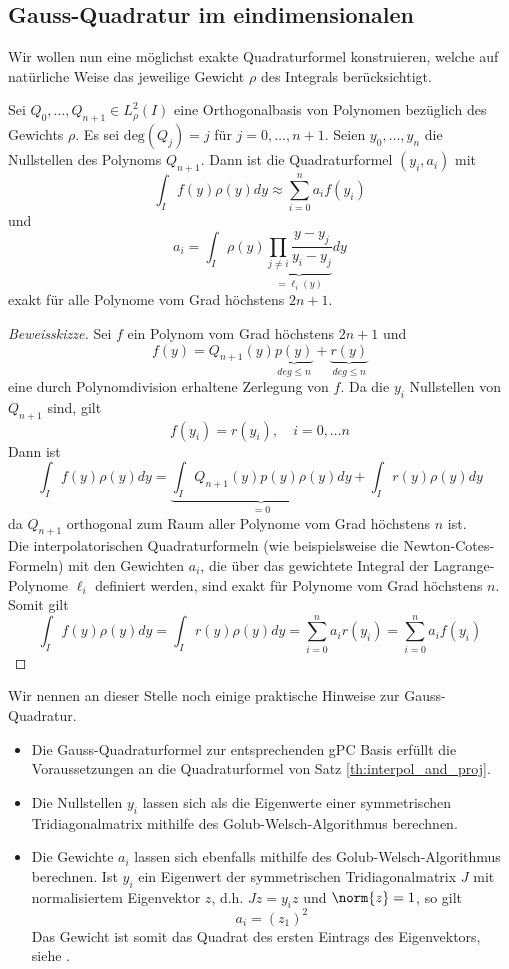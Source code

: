 \subsection{Gauss-Quadratur im eindimensionalen}
Wir wollen nun eine möglichst exakte Quadraturformel konstruieren, welche auf natürliche Weise das jeweilige Gewicht $\rho$ des Integrals berücksichtigt.
\begin{maththeorem}
Sei $Q_0,\dots,Q_{n+1}\in L_\rho^2(I)$ eine Orthogonalbasis von Polynomen bezüglich des Gewichts $\rho$. Es sei $\text{deg}(Q_j)=j$ für $j=0,\dots,n+1$. Seien $y_0,\dots,y_n$ die Nullstellen des Polynoms $Q_{n+1}$. Dann ist die Quadraturformel $(y_i,a_i)$ mit 
\[\int_If(y)\rho(y)dy\approx \sum_{i=0}^na_if(y_i)\]
und 
\[a_i=\int_I \rho(y)\underbrace{\prod_{j\neq i} \frac{y-y_j}{y_i-y_j}}_{=\ell_i(y)}dy\]
exakt für alle Polynome vom Grad höchstens $2n+1$.
\end{maththeorem} 
\begin{proof}[Beweisskizze]
Sei $f$ ein Polynom vom Grad höchstens $2n+1$ und 
\[f(y)=Q_{n+1}(y)\underbrace{p(y)}_{deg \le n}+\underbrace{r(y)}_{deg \le n}\]
eine durch Polynomdivision erhaltene Zerlegung von $f$. Da die $y_i$ Nullstellen von $Q_{n+1}$ sind, gilt
\[f(y_i)=r(y_i),\quad i=0,\dots n\]
Dann ist
\[\int_If(y)\rho(y)dy=\underbrace{\int_IQ_{n+1}(y)p(y)\rho(y)dy}_{=0}+\int_Ir(y)\rho(y)dy\]
da $Q_{n+1}$ orthogonal zum Raum aller Polynome vom Grad höchstens $n$ ist.\\
Die interpolatorischen Quadraturformeln (wie beispielsweise die Newton-Cotes-Formeln) mit den Gewichten $a_i$, die über das gewichtete Integral der Lagrange-Polynome $\ell_i$ definiert werden, sind exakt für Polynome vom Grad höchstens $n$. Somit gilt
\[\int_If(y)\rho(y)dy=\int_Ir(y)\rho(y)dy=\sum_{i=0}^{n}a_ir(y_i)=\sum_{i=0}^{n}a_if(y_i)\]
\end{proof}
\begin{mathbem}
Wir nennen an dieser Stelle noch einige praktische Hinweise zur Gauss-Quadratur.
\begin{itemize}
\item Die Gauss-Quadraturformel zur entsprechenden gPC Basis erfüllt die Voraussetzungen an die Quadraturformel von Satz \ref{th:interpol_and_proj}.
\item Die Nullstellen $y_i$ lassen sich als die Eigenwerte einer symmetrischen Tridiagonalmatrix mithilfe des Golub-Welsch-Algorithmus berechnen.
\item Die Gewichte $a_i$ lassen sich ebenfalls mithilfe des Golub-Welsch-Algorithmus berechnen. Ist $y_i$ ein Eigenwert der symmetrischen Tridiagonalmatrix $J$ mit normalisiertem Eigenvektor $z$, d.h. $Jz=y_iz$ und $\norm{z}=1$, so gilt
\[a_i=(z_1)^2\]
Das Gewicht ist somit das Quadrat des ersten Eintrags des Eigenvektors, siehe \autocite{GolubWelsch}.
\end{itemize}
\end{mathbem}
